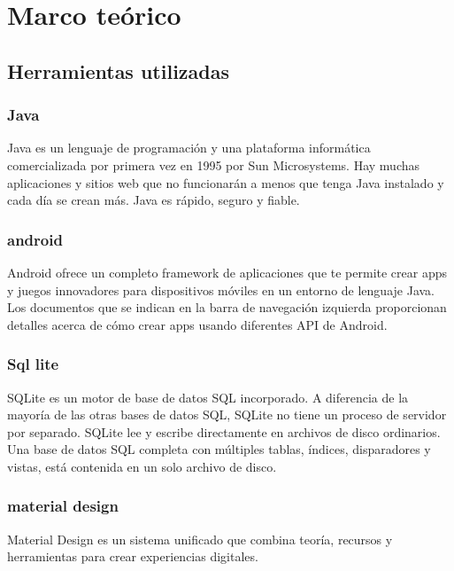 \chapter{Marco te\'orico}



\section{Herramientas utilizadas}

\subsection{Java}
Java es un lenguaje de programación y una plataforma informática comercializada por primera vez en 1995 por Sun Microsystems. Hay muchas aplicaciones y sitios web que no funcionarán a menos que tenga Java instalado y cada día se crean más. Java es rápido, seguro y fiable. 
\cite[Oracle Corporation. (2018)]{referencia7}


\subsection{android}
Android ofrece un completo framework de aplicaciones que te permite crear apps y juegos innovadores para dispositivos móviles en un entorno de lenguaje Java. Los documentos que se indican en la barra de navegación izquierda proporcionan detalles acerca de cómo crear apps usando diferentes API de Android.
\cite[Android. (2018)]{referencia6}



\subsection{Sql lite}
SQLite es un motor de base de datos SQL incorporado. A diferencia de la mayoría de las otras bases de datos SQL, SQLite no tiene un proceso de servidor por separado. SQLite lee y escribe directamente en archivos de disco ordinarios. Una base de datos SQL completa con múltiples tablas, índices, disparadores y vistas, está contenida en un solo archivo de disco.
	\cite[sqlLite. (2017)]{referencia1}

\subsection{material design}
Material Design es un sistema unificado que combina teoría, recursos y herramientas para crear experiencias digitales.
\cite[Material Design. (2017)]{referencia2}



